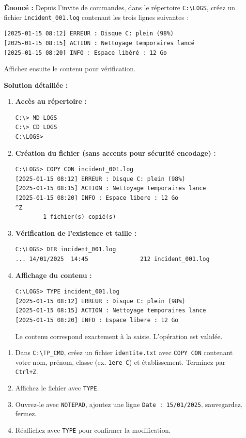 \documentclass[11pt]{article}
\newcounter{popsec}
\newcounter{popsub}
\newcommand{\courssub}[1]{%
  \stepcounter{popsub}%
  \par\vspace{9pt}\noindent{\popxbold\fontsize{11.5}{13}\selectfont\color{popink}{\color{poporange}\thepopsec.\thepopsub}\hspace{6pt}#1}\par\nopagebreak\vspace{4pt}
}
\begin{document}
\begin{exoresolu}
\textbf{Énoncé :} Depuis l'invite de commandes, dans le répertoire \texttt{C:\textbackslash{}LOGS}, créez un fichier \texttt{incident\_001.log} contenant les trois lignes suivantes :
\begin{lstlisting}
[2025-01-15 08:12] ERREUR : Disque C: plein (98%)
[2025-01-15 08:15] ACTION : Nettoyage temporaires lancé
[2025-01-15 08:20] INFO : Espace libéré : 12 Go
\end{lstlisting}
Affichez ensuite le contenu pour vérification.

\textbf{Solution détaillée :}
\begin{enumerate}
    \item \textbf{Accès au répertoire :}
    \begin{lstlisting}
C:\> MD LOGS
C:\> CD LOGS
C:\LOGS>
    \end{lstlisting}
    \item \textbf{Création du fichier (sans accents pour sécurité encodage) :}
    \begin{lstlisting}
C:\LOGS> COPY CON incident_001.log
[2025-01-15 08:12] ERREUR : Disque C: plein (98%)
[2025-01-15 08:15] ACTION : Nettoyage temporaires lance
[2025-01-15 08:20] INFO : Espace libere : 12 Go
^Z
        1 fichier(s) copié(s)
    \end{lstlisting}
    \item \textbf{Vérification de l'existence et taille :}
    \begin{lstlisting}
C:\LOGS> DIR incident_001.log
... 14/01/2025  14:45               212 incident_001.log
    \end{lstlisting}
    \item \textbf{Affichage du contenu :}
    \begin{lstlisting}
C:\LOGS> TYPE incident_001.log
[2025-01-15 08:12] ERREUR : Disque C: plein (98%)
[2025-01-15 08:15] ACTION : Nettoyage temporaires lance
[2025-01-15 08:20] INFO : Espace libere : 12 Go
    \end{lstlisting}
    Le contenu correspond exactement à la saisie. L'opération est validée.
\end{enumerate}
\end{exoresolu}

\courssub{Exercices d'application}

\begin{exercice}
\begin{enumerate}
    \item Dans \texttt{C:\textbackslash{}TP\_CMD}, créez un fichier \texttt{identite.txt} avec \texttt{COPY CON} contenant votre nom, prénom, classe (ex. \texttt{1ere C}) et établissement. Terminez par \texttt{Ctrl+Z}.
    \item Affichez le fichier avec \texttt{TYPE}.
    \item Ouvrez-le avec \texttt{NOTEPAD}, ajoutez une ligne \texttt{Date : 15/01/2025}, sauvegardez, fermez.
    \item Réaffichez avec \texttt{TYPE} pour confirmer la modification.
\end{enumerate}
\end{exercice}
\end{document}

